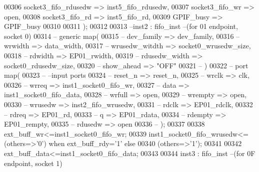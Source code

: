 \begin{DoxyCode}
00306         socket3_fifo_rdusedw        => inst5_fifo_rdusedw,
00307         socket3_fifo_wr         => \textcolor{keywordflow}{open}, 
00308         socket3_fifo_rd         => inst5_fifo_rd,
00309         GPIF_busy                   => GPIF_busy
00310         
00311         \textcolor{vhdlchar}{)};  
00312          
00313 \textcolor{keyword}{--inst2 : fifo\_inst --(for 01 endpoint, socket 0)}
00314 \textcolor{keyword}{--  generic map(}
00315 \textcolor{keyword}{--                  dev\_family      => dev\_family,}
00316 \textcolor{keyword}{--                  wrwidth         => data\_width,}
00317 \textcolor{keyword}{--                  wrusedw\_witdth  => socket0\_wrusedw\_size,  }
00318 \textcolor{keyword}{--                  rdwidth         => EP01\_rwidth,}
00319 \textcolor{keyword}{--                  rdusedw\_width   => socket0\_rdusedw\_size,}
00320 \textcolor{keyword}{--                  show\_ahead      => "OFF"}
00321 \textcolor{keyword}{--  )}
00322 \textcolor{keyword}{--  port map(}
00323 \textcolor{keyword}{--      --input ports }
00324 \textcolor{keyword}{--      reset\_n       => reset\_n,}
00325 \textcolor{keyword}{--      wrclk         => clk,}
00326 \textcolor{keyword}{--      wrreq         => inst1\_socket0\_fifo\_wr,}
00327 \textcolor{keyword}{--      data          => inst1\_socket0\_fifo\_data,}
00328 \textcolor{keyword}{--      wrfull        => open,}
00329 \textcolor{keyword}{--      wrempty       => open,}
00330 \textcolor{keyword}{--      wrusedw       => inst2\_fifo\_wrusedw,}
00331 \textcolor{keyword}{--      rdclk        => EP01\_rdclk,}
00332 \textcolor{keyword}{--      rdreq         => EP01\_rd,}
00333 \textcolor{keyword}{--      q             => EP01\_rdata,}
00334 \textcolor{keyword}{--      rdempty       => EP01\_rempty,}
00335 \textcolor{keyword}{--      rdusedw       => open   }
00336 \textcolor{keyword}{--        );}
00337           
00338 \textcolor{vhdlchar}{ext_buff_wr}\textcolor{vhdlchar}{<=}\textcolor{vhdlchar}{inst1_socket0_fifo_wr};   
00339 inst1\_socket0\_fifo\_wrusedw<=(others=>'0') \textcolor{keywordflow}{when} ext\_buff\_rdy='1' \textcolor{keywordflow}{else} 
00340                                     \textcolor{vhdlchar}{(}\textcolor{keywordflow}{others}\textcolor{vhdlchar}{=}\textcolor{vhdlchar}{>}\textcolor{vhdlchar}{'}\textcolor{vhdllogic}{}\textcolor{vhdllogic}{1}\textcolor{vhdlchar}{'}\textcolor{vhdlchar}{)};  
00341                                     
00342 \textcolor{vhdlchar}{ext_buff_data}\textcolor{vhdlchar}{<=}\textcolor{vhdlchar}{inst1_socket0_fifo_data};
00343         
00344 inst3 : fifo_inst --(\textcolor{keywordflow}{for} \textcolor{vhdllogic}{0F} endpoint, socket \textcolor{vhdllogic}{1})

\end{DoxyCode}
